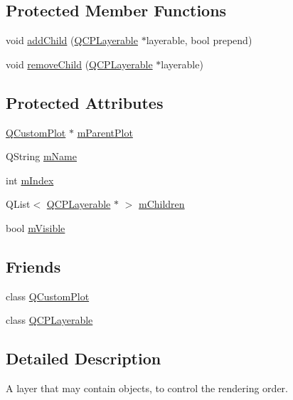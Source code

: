 \subsection*{Protected Member Functions}
\begin{DoxyCompactItemize}
\item 
void \hyperlink{class_q_c_p_layer_a57ce5e49364aa9122276d5df3b4a0ddc}{add\+Child} (\hyperlink{class_q_c_p_layerable}{Q\+C\+P\+Layerable} $\ast$layerable, bool prepend)
\item 
void \hyperlink{class_q_c_p_layer_ac2f64ac7761650582d968d86670ef362}{remove\+Child} (\hyperlink{class_q_c_p_layerable}{Q\+C\+P\+Layerable} $\ast$layerable)
\end{DoxyCompactItemize}
\subsection*{Protected Attributes}
\begin{DoxyCompactItemize}
\item 
\hyperlink{class_q_custom_plot}{Q\+Custom\+Plot} $\ast$ \hyperlink{class_q_c_p_layer_a2f3374a7884bf403720cd1cf6f7ad1bb}{m\+Parent\+Plot}
\item 
Q\+String \hyperlink{class_q_c_p_layer_a91e6298183cb4b9dfd4efdfaf1ecc220}{m\+Name}
\item 
int \hyperlink{class_q_c_p_layer_a122088bcab6cec76a52b75ce8606605b}{m\+Index}
\item 
Q\+List$<$ \hyperlink{class_q_c_p_layerable}{Q\+C\+P\+Layerable} $\ast$ $>$ \hyperlink{class_q_c_p_layer_a704aa71bba469383c3a3c598c1ec0d28}{m\+Children}
\item 
bool \hyperlink{class_q_c_p_layer_a264950deb08e589460c126c895a1e2b5}{m\+Visible}
\end{DoxyCompactItemize}
\subsection*{Friends}
\begin{DoxyCompactItemize}
\item 
class \hyperlink{class_q_c_p_layer_a1cdf9df76adcfae45261690aa0ca2198}{Q\+Custom\+Plot}
\item 
class \hyperlink{class_q_c_p_layer_ad655f55cccf49ba14d5172ec517e07ae}{Q\+C\+P\+Layerable}
\end{DoxyCompactItemize}


\subsection{Detailed Description}
A layer that may contain objects, to control the rendering order. 

